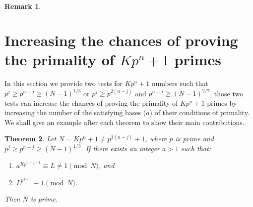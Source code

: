 \documentclass{amsart}
\newtheorem{theorem}{Theorem}[section]
\newtheorem{remark}[theorem]{Remark}
\numberwithin{equation}{section}
\begin{document}
\begin{remark}
	
\end{remark}

\section{Increasing the chances of proving the primality of $Kp^n+1$ primes}
In this section we provide two tests for $Kp^n+1$ numbers such that $p^j \ge p^{n-j} \ge (N-1)^{1/3}$ or $p^j \ge p^{2(n-j)} $ and $p^{n-j} \ge (N-1)^{2/7}$, those two tests can increase the chances of proving the primality of $Kp^n+1$ primes by increasing the number of the satisfying bases ($a$) of their conditions of primality. We shall give an example after each theorem to show their main contributions.


\begin{theorem}\label{thm31}
	Let $N=Kp^n+1 \neq p^{3(n-j)}+1$,  where $p$ is prime and $p^j \ge p^{n-j} \ge (N-1)^{1/3}$. If there exists an integer $a>1$ such that: 
	\begin{enumerate}
		\item[(i)] $a^{Kp^{n-j-1}} \equiv L \neq 1 \pmod N$, and
		\item[(ii)] $L^{p^{j+1}} \equiv 1 \pmod N$.
	\end{enumerate}
	Then $N$ is prime.
\end{theorem}
\end{document}
